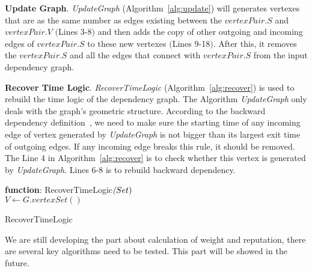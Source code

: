 \textbf{Update Graph}.
\emph{UpdateGraph} (Algorithm~\ref{alg:update}) will generates vertexes that are as the same number as edges existing between the $vertexPair.S$ and $vertexPair.V$ $($Lines 3-8$)$ and then adds the copy of other outgoing and incoming edges of $vertexPair.S$ to these new vertexes $($Lines 9-18$)$. After this, it removes the $vertexPair.S$ and all the edges that connect with $vertexPair.S$ from the input dependency graph.

\textbf{Recover Time Logic}.
 \emph{RecoverTimeLogic} (Algorithm~\ref{alg:recover}) is used to rebuild the time logic of the dependency graph. The Algorithm \emph{UpdateGraph} only deals with the graph's geometric structure. According to the backward dependency definition~\cite{backtracking,backtrackingfile,backtracking2}, we need to make sure the starting time of any incoming edge of vertex generated by \emph{UpdateGraph} is not bigger than its largest exit time of outgoing edges. If any incoming edge breaks this rule, it should be removed. The Line 4 in Algorithm~\ref{alg:recover} is to check whether this vertex is generated by \emph{UpdateGraph}. Lines 6-8 is to rebuild backward dependency.  

\begin{algorithm}[!htb]

	\textbf{function}: RecoverTimeLogic$\textit(Set)$\\
	$V \leftarrow G.vertexSet()$\;
	\caption{RecoverTimeLogic}
	\label{alg:recover} 	
\end{algorithm}

We are still developing the part about calculation of weight and reputation, there are several key algorithms need to be tested. This part will be showed in the future. 

